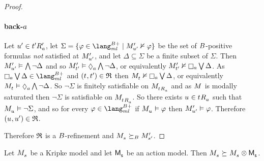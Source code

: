 \begin{proof}
\paragraph{back-$a$}
Let ${u}^{\prime} \in {{t}^{\prime}} {R^{\prime}_{a}}$, let $\Sigma = \{\phi \in \langMlPlusBs \mid \kPModelP{\kStateUP} \nentails \phi\}$ be the set of $B$-positive formulas {\em not} satisfied at ${M^{\prime}_{{u}^{\prime}}}$, and let $\Delta \subseteq \Sigma$ be a finite subset of $\Sigma$.
Then ${M^{\prime}_{{u}^{\prime}}} \vDash \bigwedge \lnot \Delta$ and so $\kPModelP{\kStateTP} \entails \possibleA \bigwedge \lnot \Delta$, or equivalently $\kPModelP{\kStateTP} \nentails \necessaryA \bigvee \Delta$.
As $\necessaryA \bigvee \Delta \in \langMlPlusBs$ and $(\kStateT, \kStateTP) \in \refinement$ then $\kPModel{\kStateT} \nentails \necessaryA \bigvee \Delta$, or equivalently $\kPModel{\kStateT} \entails \possibleA \bigwedge \lnot \Delta$.
So $\lnot \Sigma$ is finitely satisfiable on $\kPModel{\kSuccessorsA{\kStateT}}$ and as $\kModel$ is modally saturated then $\lnot \Sigma$ is satisfiable on $\kPModel{\kSuccessorsA{\kStateT}}$.
So there exists $\kStateU \in \kSuccessorsA{\kStateT}$ such that $\kPModel{\kStateU} \entails \lnot \Sigma$, and so for every $\phi \in \langMlPlusBs$ if $\kPModel{\kStateU} \entails \phi$ then ${M^{\prime}_{{u}^{\prime}}} \vDash \varphi$.
Therefore $(\kStateU, \kStateUP) \in \refinement$.

Therefore $\mathfrak{R}$ is a $B$-refinement and $\kPModel{\kStateS} \simulatesBs \kPModelP{\kStateSP}$.
\end{proof}

\begin{proposition}
Let $\kPModel{\kStateS}$ be a Kripke model and let $\aPModel{\aStateS}$ be an action model.
Then $\kPModel{\kStateS} \simulates \kPModel{\kStateS} \exec \aPModel{\aStateS}$.
\end{proposition}

